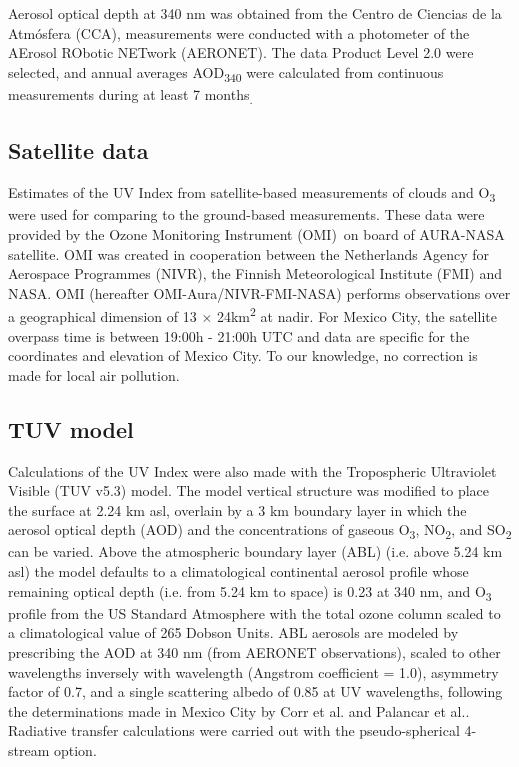 \documentclass[10pt]{article}
\begin{document}
Aerosol optical depth at 340 nm was obtained from the Centro de Ciencias
de la Atmósfera (CCA), measurements were conducted with a photometer of
the AErosol RObotic NETwork (AERONET\cite{Holben_1998}). The data
Product Level 2.0 were selected, and annual averages
AOD\textsubscript{340} were calculated from continuous measurements
during at least 7 months\textsubscript{.}

\subsection*{Satellite data}

{\label{800866}}

Estimates of the UV Index from satellite-based measurements of clouds
and O\textsubscript{3} were used for comparing to the ground-based
measurements. These data were provided by the Ozone Monitoring
Instrument (OMI)~on board of AURA-NASA satellite.\cite{dcio} OMI
was created in cooperation between the Netherlands Agency for Aerospace
Programmes (NIVR), the Finnish Meteorological Institute (FMI) and NASA.
OMI (hereafter OMI-Aura/NIVR-FMI-NASA) performs observations over a
geographical dimension of 13 × 24km\textsuperscript{2} at nadir. For
Mexico City, the satellite overpass time is between 19:00h - 21:00h UTC
and data are specific for the coordinates and elevation of Mexico City.
To our knowledge, no correction is made for local air pollution.

\subsection*{TUV model}

{\label{308972}}

Calculations of the UV Index were also made with the Tropospheric
Ultraviolet Visible (TUV v5.3) model.\cite{Madronich_1987} The model
vertical structure was modified to place the surface at 2.24 km asl,
overlain by a 3 km boundary layer\cite{Shaw_2007,Fast_2007} in which the aerosol
optical depth (AOD) and the concentrations of gaseous
O\textsubscript{3}, NO\textsubscript{2}, and SO\textsubscript{2} can be
varied. Above the atmospheric boundary layer (ABL) (i.e. above 5.24 km
asl) the model defaults to a climatological continental aerosol
profile\cite{Elterman_1966} whose remaining optical depth (i.e. from 5.24
km to space) is 0.23 at 340 nm, and O\textsubscript{3} profile from the
US Standard Atmosphere with the total ozone column scaled to a
climatological value of 265 Dobson Units. ABL aerosols are modeled by
prescribing the AOD at 340 nm (from AERONET observations), scaled to
other wavelengths inversely with wavelength (Angstrom coefficient =
1.0), asymmetry factor of 0.7, and a single scattering albedo of 0.85 at
UV wavelengths, following the determinations made in Mexico City by Corr
et al.\cite{Corr_2009} and Palancar et al.\cite{Palancar_2013}.
Radiative transfer calculations were carried out with the
pseudo-spherical 4-stream option.
\end{document}
